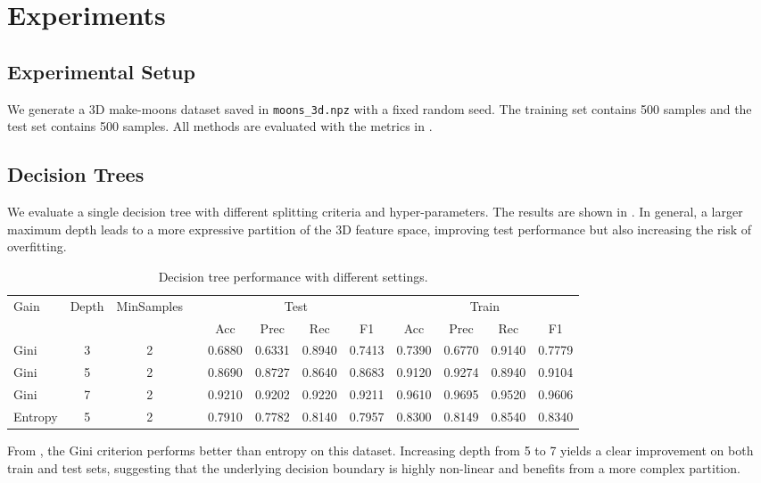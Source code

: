 \documentclass{article}
\begin{document}
\section{Experiments}
\label{sec:experiments}

\subsection{Experimental Setup}
We generate a 3D make-moons dataset saved in \texttt{moons\_3d.npz} with a fixed random seed.
The training set contains 500 samples and the test set contains 500 samples.
All methods are evaluated with the metrics in .

\subsection{Decision Trees}
We evaluate a single decision tree with different splitting criteria and hyper-parameters. The results are shown in . In general, a larger maximum depth leads to a more expressive partition of the 3D feature space, improving test performance but also increasing the risk of overfitting.

\begin{table}[H]
    \centering
    \caption{Decision tree performance with different settings.}
    \label{tab:dt_results}
    \begin{tabular}{lccc|cccc|cccc}
        \toprule
        Gain & Depth & MinSamples &  & \multicolumn{4}{c}{Test} & \multicolumn{4}{c}{Train} \\
        \cmidrule(lr){5-8} \cmidrule(lr){9-12}
         &  &  &  & Acc & Prec & Rec & F1 & Acc & Prec & Rec & F1 \\
        \midrule
        Gini    & 3 & 2 &  & 0.6880 & 0.6331 & 0.8940 & 0.7413 & 0.7390 & 0.6770 & 0.9140 & 0.7779 \\
        Gini    & 5 & 2 &  & 0.8690 & 0.8727 & 0.8640 & 0.8683 & 0.9120 & 0.9274 & 0.8940 & 0.9104 \\
        Gini    & 7 & 2 &  & 0.9210 & 0.9202 & 0.9220 & 0.9211 & 0.9610 & 0.9695 & 0.9520 & 0.9606 \\
        Entropy & 5 & 2 &  & 0.7910 & 0.7782 & 0.8140 & 0.7957 & 0.8300 & 0.8149 & 0.8540 & 0.8340 \\
        \bottomrule
    \end{tabular}
\end{table}

From , the Gini criterion performs better than entropy on this dataset. Increasing depth from 5 to 7 yields a clear improvement on both train and test sets, suggesting that the underlying decision boundary is highly non-linear and benefits from a more complex partition.
\end{document}
